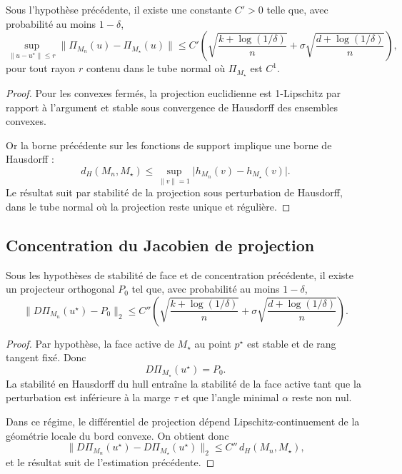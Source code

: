 \begin{theorem}
Sous l'hypothèse précédente, il existe une constante \(C'>0\) telle que, avec probabilité au moins \(1-\delta\),
\[
\sup_{\|u-u^\star\|\le r}
\|\Pi_{M_n}(u)-\Pi_{M_\star}(u)\|
\le
C'
\left(
\sqrt{\frac{k+\log(1/\delta)}{n}}
+
\sigma\sqrt{\frac{d+\log(1/\delta)}{n}}
\right),
\]
pour tout rayon \(r\) contenu dans le tube normal où \(\Pi_{M_\star}\) est \(C^1\).
\end{theorem}

\begin{proof}
Pour les convexes fermés, la projection euclidienne est 1-Lipschitz par rapport à l'argument et stable sous convergence de Hausdorff des ensembles convexes.

Or la borne précédente sur les fonctions de support implique une borne de Hausdorff :
\[
d_H(M_n,M_\star)
\le
\sup_{\|v\|=1}\bigl|h_{M_n}(v)-h_{M_\star}(v)\bigr|.
\]
Le résultat suit par stabilité de la projection sous perturbation de Hausdorff, dans le tube normal où la projection reste unique et régulière.
\end{proof}

\subsection{Concentration du Jacobien de projection}

\begin{theorem}
Sous les hypothèses de stabilité de face et de concentration précédente, il existe un projecteur orthogonal \(P_0\) tel que, avec probabilité au moins \(1-\delta\),
\[
\|D\Pi_{M_n}(u^\star)-P_0\|_2
\le
C''
\left(
\sqrt{\frac{k+\log(1/\delta)}{n}}
+
\sigma\sqrt{\frac{d+\log(1/\delta)}{n}}
\right).
\]
\end{theorem}

\begin{proof}
Par hypothèse, la face active de \(M_\star\) au point \(p^\star\) est stable et de rang tangent fixé.
Donc
\[
D\Pi_{M_\star}(u^\star)=P_0.
\]
La stabilité en Hausdorff du hull entraîne la stabilité de la face active tant que la perturbation est inférieure à la marge \(\tau\) et que l'angle minimal \(\alpha\) reste non nul.

Dans ce régime, le différentiel de projection dépend Lipschitz-continuement de la géométrie locale du bord convexe.
On obtient donc
\[
\|D\Pi_{M_n}(u^\star)-D\Pi_{M_\star}(u^\star)\|_2
\le
C''\, d_H(M_n,M_\star),
\]
et le résultat suit de l'estimation précédente.
\end{proof}

